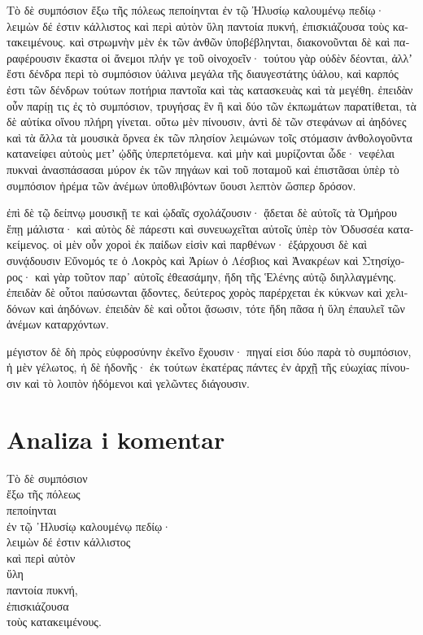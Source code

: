 {\large

\begin{greek}

\noindent Τὸ δὲ συμπόσιον ἔξω τῆς πόλεως πεποίηνται ἐν τῷ Ἠλυσίῳ καλουμένῳ πεδίῳ· λειμὼν δέ ἐστιν κάλλιστος καὶ περὶ αὐτὸν ὕλη παντοία πυκνή, ἐπισκιάζουσα τοὺς κατακειμένους. καὶ στρωμνὴν μὲν ἐκ τῶν ἀνθῶν ὑποβέβληνται, διακονοῦνται δὲ καὶ παραφέρουσιν ἕκαστα οἱ ἄνεμοι πλήν γε τοῦ οἰνοχοεῖν· τούτου γὰρ οὐδὲν δέονται, ἀλλʼ ἔστι δένδρα περὶ τὸ συμπόσιον ὑάλινα μεγάλα τῆς διαυγεστάτης ὑάλου, καὶ καρπός ἐστι τῶν δένδρων τούτων ποτήρια παντοῖα καὶ τὰς κατασκευὰς καὶ τὰ μεγέθη. ἐπειδὰν οὖν παρίῃ τις ἐς τὸ συμπόσιον, τρυγήσας ἓν ἢ καὶ δύο τῶν ἐκπωμάτων παρατίθεται, τὰ δὲ αὐτίκα οἴνου πλήρη γίνεται. οὕτω μὲν πίνουσιν, ἀντὶ δὲ τῶν στεφάνων αἱ ἀηδόνες καὶ τὰ ἄλλα τὰ μουσικὰ ὄρνεα ἐκ τῶν πλησίον λειμώνων τοῖς στόμασιν ἀνθολογοῦντα κατανείφει αὐτοὺς μετʼ ᾠδῆς ὑπερπετόμενα. καὶ μὴν καὶ μυρίζονται ὧδε· νεφέλαι πυκναὶ ἀνασπάσασαι μύρον ἐκ τῶν πηγάων καὶ τοῦ ποταμοῦ καὶ ἐπιστᾶσαι ὑπὲρ τὸ συμπόσιον ἠρέμα τῶν ἀνέμων ὑποθλιβόντων ὕουσι λεπτὸν ὥσπερ δρόσον.

\noindent ἐπὶ δὲ τῷ δείπνῳ μουσικῇ τε καὶ ᾠδαῖς σχολάζουσιν· ᾄδεται δὲ αὐτοῖς τὰ Ὁμήρου ἔπῃ μάλιστα· καὶ αὐτὸς δὲ πάρεστι καὶ συνευωχεῖται αὐτοῖς ὑπὲρ τὸν Ὀδυσσέα κατακείμενος. οἱ μὲν οὖν χοροὶ ἐκ παίδων εἰσὶν καὶ παρθένων· ἐξάρχουσι δὲ καὶ συνᾴδουσιν Εὔνομός τε ὁ Λοκρὸς καὶ Ἀρίων ὁ Λέσβιος καὶ Ἀνακρέων καὶ Στησίχορος· καὶ γὰρ τοῦτον παρ᾽ αὐτοῖς ἐθεασάμην, ἤδη τῆς Ἑλένης αὐτῷ διηλλαγμένης. ἐπειδὰν δὲ οὗτοι παύσωνται ᾄδοντες, δεύτερος χορὸς παρέρχεται ἐκ κύκνων καὶ χελιδόνων καὶ ἀηδόνων. ἐπειδὰν δὲ καὶ οὗτοι ᾄσωσιν, τότε ἤδη πᾶσα ἡ ὕλη ἐπαυλεῖ τῶν ἀνέμων καταρχόντων.

\noindent μέγιστον δὲ δὴ πρὸς εὐφροσύνην ἐκεῖνο ἔχουσιν· πηγαί εἰσι δύο παρὰ τὸ συμπόσιον, ἡ μὲν γέλωτος, ἡ δὲ ἡδονῆς· ἐκ τούτων ἑκατέρας πάντες ἐν ἀρχῇ τῆς εὐωχίας πίνουσιν καὶ τὸ λοιπὸν ἡδόμενοι καὶ γελῶντες διάγουσιν.

\end{greek}

}


\section*{Analiza i komentar}


{\large
\begin{greek}
\noindent Τὸ δὲ συμπόσιον \\
 \tabto{2em} ἔξω τῆς πόλεως \\
πεποίηνται \\
\tabto{2em} ἐν τῷ ᾿Ηλυσίῳ καλουμένῳ πεδίῳ· \\
\tabto{4em} λειμὼν δέ ἐστιν κάλλιστος \\
\tabto{4em} καὶ περὶ αὐτὸν \\
\tabto{4em} ὕλη \\
\tabto{6em} παντοία πυκνή, \\
\tabto{6em} ἐπισκιάζουσα \\
\tabto{8em} τοὺς κατακειμένους. \\

\end{greek}
}

